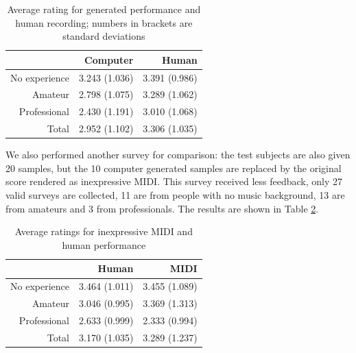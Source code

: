 \begin{table}
   \centering
   \caption{Average rating for generated performance and human recording; numbers in brackets are standard deviations} 
   \label{tab:avg_rating}
   \begin{tabular}{r|rr}
      \hline
      &Computer &Human \\
      \hline
      No experience&3.243 (1.036)&3.391 (0.986)\\
      Amateur&2.798 (1.075)&3.289 (1.062)\\
      Professional&2.430 (1.191)&3.010 (1.068)\\
      \hline
      Total&2.952 (1.102)&3.306 (1.035)\\
      \hline
   \end{tabular}
\end{table}

We also performed another survey for comparison: the test subjects are also given 20 samples, but the 10 computer generated samples are replaced by the original score rendered as inexpressive MIDI. This survey received less feedback, only 27 valid surveys are collected, 11 are from people with no music background, 13 are from amateurs and 3 from professionals. The results are shown in Table \ref{tab:ctrl_avg}.

\begin{table}
   \centering
   \caption{Average ratings for inexpressive MIDI and human performance}
   \label{tab:ctrl_avg}
   \begin{tabular}{r|rr}
      \hline
      &Human& MIDI \\
      \hline
      No experience&3.464 (1.011)&3.455 (1.089)\\
      Amateur&3.046 (0.995)&3.369 (1.313)\\
      Professional&2.633 (0.999)&2.333 (0.994)\\
      \hline
      Total&3.170 (1.035)&3.289 (1.237)\\
\hline
   \end{tabular}
\end{table}

